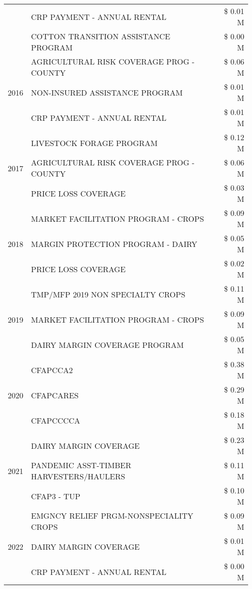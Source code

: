 \begin{tabular}{llr}
 & CRP PAYMENT - ANNUAL RENTAL & \$ 0.01 M \\
 & COTTON TRANSITION ASSISTANCE PROGRAM & \$ 0.00 M \\
\cline{1-3}
\multirow[t]{3}{*}{2016} & AGRICULTURAL RISK COVERAGE PROG - COUNTY & \$ 0.06 M \\
 & NON-INSURED ASSISTANCE PROGRAM & \$ 0.01 M \\
 & CRP PAYMENT - ANNUAL RENTAL & \$ 0.01 M \\
\cline{1-3}
\multirow[t]{3}{*}{2017} & LIVESTOCK FORAGE PROGRAM & \$ 0.12 M \\
 & AGRICULTURAL RISK COVERAGE PROG - COUNTY & \$ 0.06 M \\
 & PRICE LOSS COVERAGE & \$ 0.03 M \\
\cline{1-3}
\multirow[t]{3}{*}{2018} & MARKET FACILITATION PROGRAM - CROPS & \$ 0.09 M \\
 & MARGIN PROTECTION PROGRAM - DAIRY & \$ 0.05 M \\
 & PRICE LOSS COVERAGE & \$ 0.02 M \\
\cline{1-3}
\multirow[t]{3}{*}{2019} & TMP/MFP 2019 NON SPECIALTY CROPS & \$ 0.11 M \\
 & MARKET FACILITATION PROGRAM - CROPS & \$ 0.09 M \\
 & DAIRY MARGIN COVERAGE PROGRAM & \$ 0.05 M \\
\cline{1-3}
\multirow[t]{3}{*}{2020} & CFAPCCA2 & \$ 0.38 M \\
 & CFAPCARES & \$ 0.29 M \\
 & CFAPCCCCA & \$ 0.18 M \\
\cline{1-3}
\multirow[t]{3}{*}{2021} & DAIRY MARGIN COVERAGE & \$ 0.23 M \\
 & PANDEMIC ASST-TIMBER HARVESTERS/HAULERS & \$ 0.11 M \\
 & CFAP3 - TUP & \$ 0.10 M \\
\cline{1-3}
\multirow[t]{3}{*}{2022} & EMGNCY RELIEF PRGM-NONSPECIALITY CROPS & \$ 0.09 M \\
 & DAIRY MARGIN COVERAGE & \$ 0.01 M \\
 & CRP PAYMENT - ANNUAL RENTAL & \$ 0.00 M \\
\cline{1-3}
\bottomrule
\end{tabular}
